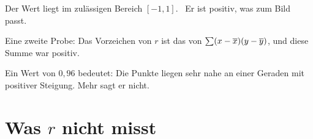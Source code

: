 \begin{merksatz}
Der Wert liegt im zulässigen Bereich $[-1,1]$. \checkmark\ Er ist positiv, was zum Bild passt. \checkmark

Eine zweite Probe: Das Vorzeichen von $r$ ist das von $\sum(x-\overline{x})(y-\overline y)$, und diese Summe war positiv. \checkmark

Ein Wert von $0{,}96$ bedeutet: Die Punkte liegen sehr nahe an einer Geraden mit positiver Steigung. Mehr sagt er nicht.

\begin{center}
\begin{minipage}{0.88\textwidth}
\end{minipage}
\end{center}
\end{merksatz}

\section{Was $r$ nicht misst}


